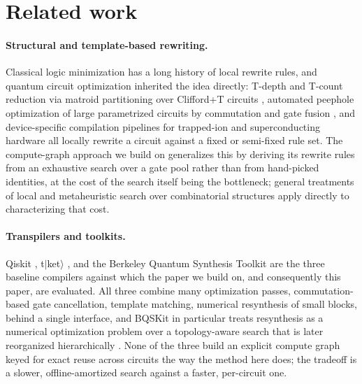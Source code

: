 \documentclass[11pt]{article}
\begin{document}
\section{Related work}
\label{sec:related}

\paragraph{Structural and template-based rewriting.} Classical logic
minimization has a long history of local rewrite rules, and quantum
circuit optimization inherited the idea directly: T-depth and T-count
reduction via matroid partitioning over Clifford+T circuits
\cite{Amy2014TDepth}, automated peephole optimization of large
parametrized circuits by commutation and gate fusion
\cite{Nam2018Automated}, and device-specific compilation pipelines for
trapped-ion \cite{Maslov2017IonTrap} and superconducting
\cite{ZulehnerPalerWille2018} hardware all locally rewrite a circuit
against a fixed or semi-fixed rule set. The compute-graph approach we
build on generalizes this by deriving its rewrite rules from an exhaustive
search over a gate pool rather than from hand-picked identities, at the
cost of the search itself being the bottleneck; general treatments of
local and metaheuristic search over combinatorial structures
\cite{BlumRoli2003Metaheuristics} apply directly to characterizing that
cost.

\paragraph{Transpilers and toolkits.} Qiskit \cite{JavadiAbhari2024Qiskit},
t$|$ket$\rangle$ \cite{Sivarajah2020Tket}, and the Berkeley Quantum
Synthesis Toolkit \cite{Younis2021BQSKit} are the three baseline compilers
against which the paper we build on, and consequently this paper, are
evaluated. All three combine many optimization passes, commutation-based
gate cancellation, template matching, numerical resynthesis of small
blocks, behind a single interface, and BQSKit in particular treats
resynthesis as a numerical optimization problem over a topology-aware
search \cite{Davis2020TopologyAware} that is later reorganized
hierarchically \cite{Wu2021HierarchicalSynthesis}. None of the three build
an explicit compute graph keyed for exact reuse across circuits the way
the method here does; the tradeoff is a slower, offline-amortized search
against a faster, per-circuit one.
\end{document}
